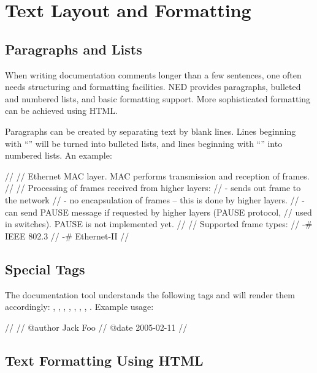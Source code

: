 \section{Text Layout and Formatting}
\label{sec:neddoc:text-layout-and-formatting}

\subsection{Paragraphs and Lists}
\label{sec:neddoc:paragraphs-and-lists}

When writing documentation comments longer than a few sentences, one often
needs structuring and formatting facilities. NED provides paragraphs,
bulleted and numbered lists, and basic formatting support. More
sophisticated formatting can be achieved using HTML.

Paragraphs can be created by separating text by blank lines. Lines
beginning with ``\ttt{-}'' will be turned into bulleted lists, and lines
beginning with ``\ttt{-\#}'' into numbered lists. An example:

\begin{ned}
//
// Ethernet MAC layer. MAC performs transmission and reception of frames.
//
// Processing of frames received from higher layers:
// - sends out frame to the network
// - no encapsulation of frames -- this is done by higher layers.
// - can send PAUSE message if requested by higher layers (PAUSE protocol,
//   used in switches). PAUSE is not implemented yet.
//
// Supported frame types:
// -# IEEE 802.3
// -# Ethernet-II
//
\end{ned}


\subsection{Special Tags}
\label{sec:neddoc:special-tags}

The documentation tool understands the following tags and will render them accordingly:
, , , , , ,
, . Example usage:

\begin{ned}
//
// @author Jack Foo
// @date 2005-02-11
//
\end{ned}


\subsection{Text Formatting Using HTML}
\label{sec:neddoc:text-formatting-using-html}

